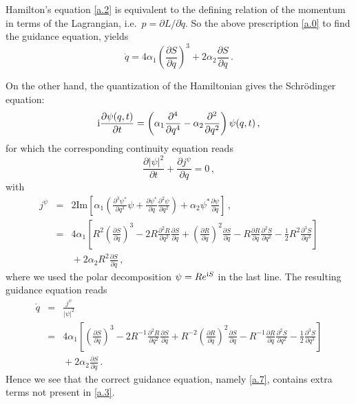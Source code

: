 \documentclass[12pt]{article}
\def\pa{\partial}
\def\al{\alpha}
\def\ii{\textrm i}
\begin{document}
Hamilton's equation \eqref{a.2} is equivalent to the defining relation of the momentum in terms of the Lagrangian, i.e.\ $p = \pa L/ \pa {\dot q}$. So the above prescription \eqref{a.0} to find the guidance equation, yields
\begin{equation}
{\dot q} =  4 \al_1 \left(\frac{\pa S}{\pa q} \right)^3 + 2 \al_2 \frac{\pa S}{\pa q} \,.
\label{a.3}
\end{equation}

On the other hand, the quantization of the Hamiltonian gives the Schr\"odinger equation:
\begin{equation}
\ii \frac{\pa \psi(q,t)}{\pa t} = \left( \al_1 \frac{\pa^4}{\pa q^4} -  \al_2 \frac{\pa^2}{\pa q^2} \right) \psi(q,t) \,,
\label{a.4}
\end{equation}
for which the corresponding continuity equation reads
\begin{equation}
\frac{\pa |\psi|^2}{\pa t} +  \frac{\pa j^\psi}{\pa q} = 0\,,
\label{a.5}
\end{equation}
with
\begin{eqnarray}
j^\psi &=& 2 \textrm{Im} \left[ \al_1 \left( \frac{\pa^3 \psi^*}{\pa q^3} \psi + \frac{\pa \psi^*}{\pa q} \frac{\pa^2 \psi}{\pa q^2} \right) + \al_2 \psi^*  \frac{\pa \psi}{\pa q} \right] \,,\nonumber\\
&=& 4 \al_1 \left[  R^2 \left( \frac{\pa S}{\pa q} \right)^3 - 2R  \frac{\pa^2 R}{\pa q^2}  \frac{\pa S}{\pa q} + \left( \frac{\pa R}{\pa q} \right)^2 \frac{\pa S}{\pa q}   -     R\frac{\pa R}{\pa q}  \frac{\pa^2 S}{\pa q^2}  - \frac{1}{2} R^2 \frac{\pa^3 S}{\pa q^3} \right] \nonumber\\
&& \mbox{} + 2 \al_2 R^2 \frac{\pa S}{\pa q}\,,
\label{a.6}
\end{eqnarray}
where we used the polar decomposition $\psi=Re^{\ii S}$ in the last line. The resulting guidance equation reads
\begin{eqnarray}
{\dot q}  &=& \frac{j^\psi}{|\psi|^2} \nonumber\\
&=& 4 \al_1 \left[  \left( \frac{\pa S}{\pa q} \right)^3 - 2R^{-1}  \frac{\pa^2 R}{\pa q^2}  \frac{\pa S}{\pa q} + R^{-2} \left( \frac{\pa R}{\pa q} \right)^2 \frac{\pa S}{\pa q}   -     R^{-1} \frac{\pa R}{\pa q}  \frac{\pa^2 S}{\pa q^2}  - \frac{1}{2} \frac{\pa^3 S}{\pa q^3} \right] \nonumber\\
&& \mbox{}  + 2 \al_2 \frac{\pa S}{\pa q} \,.
\label{a.7}
\end{eqnarray}
Hence we see that the correct guidance equation, namely \eqref{a.7}, contains extra terms not present in \eqref{a.3}.
\end{document}

